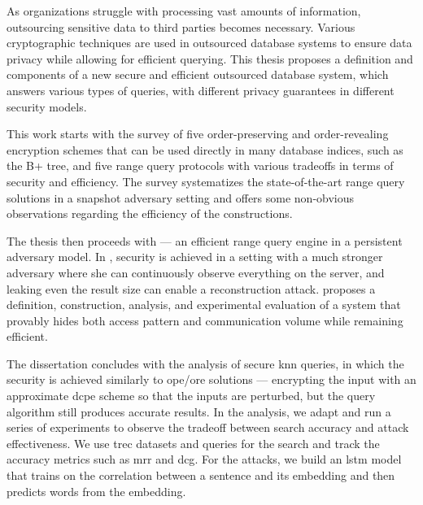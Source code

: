 As organizations struggle with processing vast amounts of information, outsourcing sensitive data to third parties becomes necessary.
Various cryptographic techniques are used in outsourced database systems to ensure data privacy while allowing for efficient querying.
This thesis proposes a definition and components of a new secure and efficient outsourced database system, which answers various types of queries, with different privacy guarantees in different security models.

This work starts with the survey of five order-preserving and order-revealing encryption schemes that can be used directly in many database indices, such as the B+ tree, and five range query protocols with various tradeoffs in terms of security and efficiency.
The survey systematizes the state-of-the-art range query solutions in a snapshot adversary setting and offers some non-obvious observations regarding the efficiency of the constructions.

The thesis then proceeds with \epsolute{} --- an efficient range query engine in a persistent adversary model.
In \epsolute{}, security is achieved in a setting with a much stronger adversary where she can continuously observe everything on the server, and leaking even the result size can enable a reconstruction attack.
\epsolute{} proposes a definition, construction, analysis, and experimental evaluation of a system that provably hides both access pattern and communication volume while remaining efficient.

The dissertation concludes with the analysis of secure \acrlong{knn} queries, in which the security is achieved similarly to \acrshort{ope}/\acrshort{ore} solutions --- encrypting the input with an approximate \acrlong{dcpe} scheme so that the inputs are perturbed, but the query algorithm still produces accurate results.
In the analysis, we adapt and run a series of experiments to observe the tradeoff between search accuracy and attack effectiveness.
We use \acrshort{trec} datasets and queries for the search and track the accuracy metrics such as \acrshort{mrr} and \acrshort{dcg}.
For the attacks, we build an \acrshort{lstm} model that trains on the correlation between a sentence and its embedding and then predicts words from the embedding.

